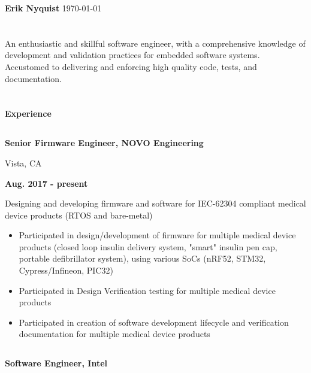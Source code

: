 \documentclass[6pt]{article}
\begin{document}
\begin{minipage}{35em}
%
%
{\Huge \bfseries Erik Nyquist}
{\hfill \today}
\section*{}
An enthusiastic and skillful software engineer, with a comprehensive knowledge of
development and validation practices for embedded software systems. Accustomed to
delivering and enforcing high quality code, tests, and documentation.
\hfill \break
\section*{}
{\Large \bfseries Experience}

\dotfill
%
%
\subsection*{}
\begin{minipage}{20em}
{\bfseries Senior Firmware Engineer, NOVO Engineering

Vista, CA}
\end{minipage}
\hfill
\begin{minipage}{10em}
{\bfseries Aug. 2017 - present}
\end{minipage}
\break

Designing and developing firmware and software for IEC-62304 compliant medical
device products (RTOS and bare-metal)
\begin{itemize}
    \item Participated in design/development of firmware for multiple medical
          device products (closed loop insulin delivery system, "smart" insulin pen
          cap, portable defibrillator system), using various SoCs (nRF52, STM32,
          Cypress/Infineon, PIC32)
    \item Participated in Design Verification testing for multiple medical device products
    \item Participated in creation of software development lifecycle and
          verification documentation for multiple medical device products
\end{itemize}
\dotfill

%
%
\subsection*{}
\begin{minipage}{20em}
{\bfseries Software Engineer, Intel

}
\end{minipage}
\end{minipage}
\end{document}

